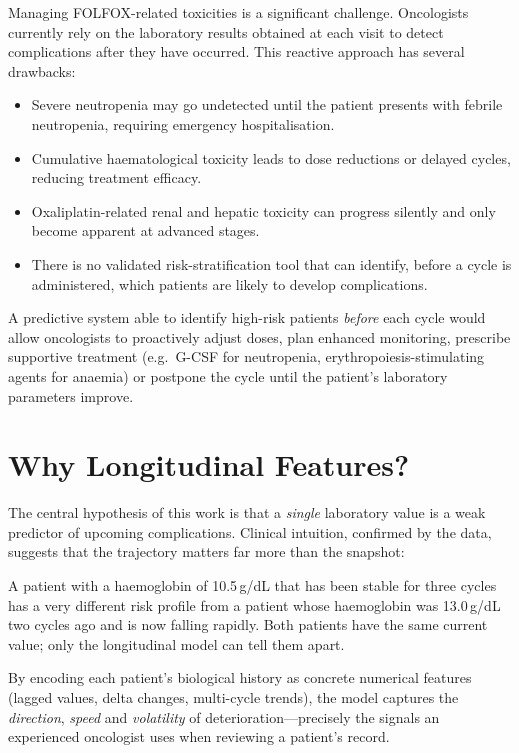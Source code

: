 \documentclass[12pt,a4paper]{report}
\begin{document}
Managing FOLFOX-related toxicities is a significant challenge. Oncologists currently rely on the laboratory results obtained at each visit to detect complications after they have occurred. This reactive approach has several drawbacks:
\begin{itemize}
  \item Severe neutropenia may go undetected until the patient presents with febrile neutropenia, requiring emergency hospitalisation.
  \item Cumulative haematological toxicity leads to dose reductions or delayed cycles, reducing treatment efficacy.
  \item Oxaliplatin-related renal and hepatic toxicity can progress silently and only become apparent at advanced stages.
  \item There is no validated risk-stratification tool that can identify, before a cycle is administered, which patients are likely to develop complications.
\end{itemize}

A predictive system able to identify high-risk patients \emph{before} each cycle would allow oncologists to proactively adjust doses, plan enhanced monitoring, prescribe supportive treatment (e.g.\ G-CSF for neutropenia, erythropoiesis-stimulating agents for anaemia) or postpone the cycle until the patient's laboratory parameters improve.

\section{Why Longitudinal Features?}

The central hypothesis of this work is that a \emph{single} laboratory value is a weak predictor of upcoming complications. Clinical intuition, confirmed by the data, suggests that the trajectory matters far more than the snapshot:

\begin{infobox}
A patient with a haemoglobin of 10.5\,g/dL that has been stable for three cycles has a very different risk profile from a patient whose haemoglobin was 13.0\,g/dL two cycles ago and is now falling rapidly. Both patients have the same current value; only the longitudinal model can tell them apart.
\end{infobox}

By encoding each patient's biological history as concrete numerical features (lagged values, delta changes, multi-cycle trends), the model captures the \emph{direction}, \emph{speed} and \emph{volatility} of deterioration---precisely the signals an experienced oncologist uses when reviewing a patient's record.
\end{document}
